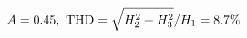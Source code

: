 \documentclass[preview]{standalone}
\begin{document}
\begin{align*}
\special{dvisvgm:raw <g id='unique000'>}A=0.45,\ \text{THD}=\sqrt{H_2^2+H_3^2}/H_1=8.7\%\special{dvisvgm:raw </g>}
\end{align*}
\end{document}
